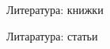 \begin{frame}{Литература: книжки}
\printbibliography[nottype=article]
\end{frame}

\begin{frame}{Литаратура: статьи}
\printbibliography[type=article]
\end{frame}
